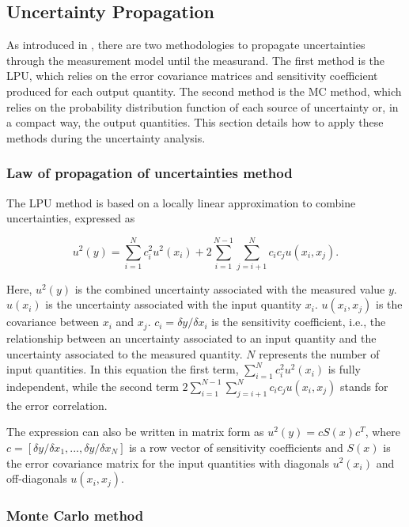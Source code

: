 \subsection{Uncertainty Propagation} \label{sec:uncertainty_propagation}

As introduced in \cite{QA4EO2}, there are two methodologies to propagate
uncertainties through the measurement model until the measurand. The first
method is the \ac{LPU}, which relies on the error covariance matrices and
sensitivity coefficient produced for each output quantity. The second method is
the \ac{MC} method, which relies on the probability distribution function of
each source of uncertainty or, in a compact way, the output quantities. This
section details how to apply these methods during the uncertainty analysis.

\subsubsection{Law of propagation of uncertainties method}

The \ac{LPU} method is based on a locally linear
approximation to combine uncertainties, expressed as

\begin{equation}
  u^2(y) = \sum_{i=1}^N c_i^2 u^2(x_i) + 2 \sum_{i=1}^{N-1} \sum_{j=i+1}^N c_i c_j u(x_i, x_j).
  \label{eq:propagation}
\end{equation}

\noindent Here, $u^2(y)$ is the combined uncertainty associated with the
measured value $y$. $u(x_i)$ is the uncertainty associated with the input
quantity $x_i$. $u(x_i, x_j)$ is the covariance between $x_i$ and $x_j$.
$c_i=\delta y/ \delta x_i $ is the sensitivity coefficient, i.e., the
relationship between an uncertainty associated to an input quantity and the
uncertainty associated to the measured quantity. $N$ represents the number of
input quantities. In this equation the first term, $\sum_{i=1}^N c_i^2
u^2(x_i)$ is fully independent, while the second term $2 \sum_{i=1}^{N-1}
\sum_{j=i+1}^N c_i c_j u(x_i, x_j)$ stands for the error correlation.

The expression can also be written in matrix form as $u^2(y)=cS(x)c^T$, where
$c=[\delta y/\delta x_1, ..., \delta y/\delta x_N]$ is a row vector of
sensitivity coefficients and $S(x)$ is the error covariance matrix for the
input quantities with diagonals $u^2(x_i)$ and off-diagonals $u(x_i, x_j)$.

\subsubsection{Monte Carlo method}

